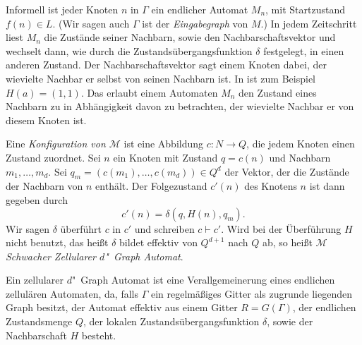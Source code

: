 \documentclass[11pt]{article}
\newcommand{\defWord}[1]{\emph{#1}}
\begin{document}
Informell ist jeder Knoten $n$ in $\Gamma$ ein endlicher Automat $M_n$, mit Startzustand $f(n) \in L$. 
(Wir sagen auch $\Gamma$ ist der \defWord{Eingabegraph} von $M$.) 
In jedem Zeitschritt liest $M_n$ die Zustände seiner Nachbarn, sowie den Nachbarschaftsvektor und wechselt dann, wie durch die Zustandsübergangsfunktion $\delta$ festgelegt, in einen anderen Zustand. 
Der Nachbarschaftsvektor sagt einem Knoten dabei, der wievielte Nachbar er selbst von seinen Nachbarn ist. 
In  ist zum Beispiel $H(a) = \left(1, 1\right)$. 
Das erlaubt einem Automaten $M_n$ den Zustand eines Nachbarn zu in Abhängigkeit davon zu betrachten, der wievielte Nachbar er von diesem Knoten ist.

\begin{definition}[Konfiguration]
	Eine \defWord{Konfiguration von $\mathcal{M}$} ist eine Abbildung \hbox{$c : N \rightarrow Q$}, die jedem Knoten einen Zustand zuordnet.
	Sei $n$ ein Knoten mit Zustand $q = c(n)$ und Nachbarn $m_1, \dots, m_d$. 
	Sei $q_m = \left( c(m_1), \dots , c(m_d)\right) \in Q^d$ der Vektor, der die Zustände der Nachbarn von $n$ enthält. 
	Der Folgezustand $c'(n)$ des Knotens $n$ ist dann gegeben durch 
	\begin{displaymath}
		c'(n) = \delta(q, H(n),q_m ).
	\end{displaymath} 
	Wir sagen $\delta$ überführt $c$ in $c'$ und schreiben $c \vdash c'$.
	Wird bei der Überführung $H$ nicht benutzt, das heißt $\delta$ bildet effektiv von $Q^{d+1}$ nach $Q$ ab, so heißt $\mathcal{M}$ \defWord{Schwacher Zellularer $d$"~Graph Automat}.
\end{definition}


\begin{bemerkung}
	Ein zellularer $d$"~Graph Automat ist eine Verallgemeinerung eines endlichen zellulären Automaten, da, falls $\Gamma$ ein regelmäßiges Gitter als zugrunde liegenden Graph besitzt, der Automat effektiv aus einem Gitter $R = G(\Gamma)$, der endlichen Zustandsmenge $Q$, der lokalen Zustandsübergangsfunktion $\delta$, sowie der Nachbarschaft $H$ besteht.
\end{bemerkung}
\end{document}
